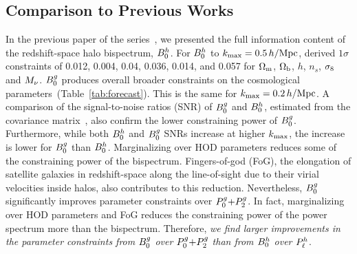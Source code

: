 \subsection{Comparison to Previous Works}
In the previous paper of the series~\citep{hahn2020}, we presented the full
information content of the redshift-space halo bispectrum, $B^h_0$. For $B^h_0$ to
$k_{\rm max}=0.5\,h/\mathrm{Mpc}$, \cite{hahn2020} derived $1\sigma$ constraints of 
0.012, 0.004, 0.04, 0.036, 0.014, and 0.057 
for $\Omega_{\rm m}$, $\Omega_{\rm b}$, $h$, $n_s$, $\sigma_8$ and $M_\nu$. 
$B^g_0$ produces overall broader constraints on the cosmological parameters~(Table~\ref{tab:forecast}). This
is the same for $k_{\rm max}=0.2\,h/\mathrm{Mpc}$. A comparison of the signal-to-noise ratios
(SNR) of $B^g_0$ and $B^h_0$, estimated from the covariance
matrix~\citep[\eg][]{sefusatti2005,sefusatti2006,chan2017}, also confirm the lower
constraining power of $B^g_0$. Furthermore, while both $B^h_0$ and $B^g_0$ SNRs increase 
at higher $k_{\rm max}$, the increase is lower for $B^g_0$ than $B^h_0$.
Marginalizing over HOD parameters reduces some of the constraining power of 
the bispectrum. Fingers-of-god (FoG), the elongation of satellite galaxies
in redshift-space along the line-of-sight due to their virial velocities inside 
halos, also contributes to this reduction. 
Nevertheless, $B^g_0$ significantly improves parameter constraints over $P^g_0{+}P^g_2$.
In fact, marginalizing over HOD parameters and FoG reduces the constraining
power of the power spectrum more than the bispectrum. Therefore, {\em we find 
larger improvements in the parameter constraints from $B^g_0$ over $P^g_0{+}P^g_2$ than
from $B^h_0$ over $P^h_{\ell}$}.

